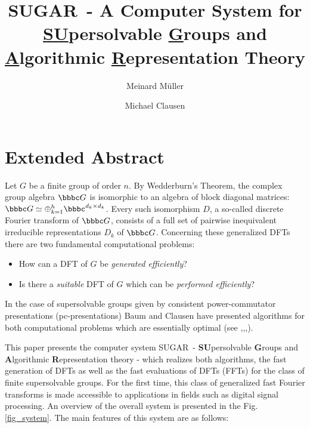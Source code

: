 \documentclass{llncs}
\def\C{{\bbbc}}
\newcommand{\NameCS}{SUGAR}
\begin{document}
\title{\NameCS\, - A Computer System for 
	\underline{SU}persolvable \underline{G}roups and 
	\underline{A}lgorithmic \underline{R}epresentation Theory} 

	
\author{Meinard M\"uller \and Michael Clausen}



\maketitle 



\section*{Extended Abstract}

Let $G$ be a finite group of order $n$. By Wedderburn's Theorem, the 
complex group algebra $\C G$ is isomorphic to an algebra of block 
diagonal matrices:
$\C G\simeq \oplus_{k=1}^h \C^{d_k\times d_k}$. 
Every such isomorphism $D$, a so-called
discrete Fourier transform of $\C G$, consists of a full set of pairwise 
inequivalent irreducible  representations $D_k$ of $\C G$. 
Concerning these generalized DFTs there are two fundamental
computational problems: 
\begin{itemize}
\item [(1)] How can a DFT of $G$ be {\em generated efficiently}?
\item [(2)] Is there a {\em suitable} DFT of $G$ which can be 
    {\em performed efficiently}?
\end{itemize}
In the case of supersolvable groups given by 
consistent power-commutator presentations (pc-presentations)
Baum and Clausen have presented algorithms for both computational
problems which are essentially optimal 
(see \cite{Ba91},\cite{BaCl94},\cite{ClBa93},\cite{ClMu99}).

This paper presents the computer system \NameCS\,
- {\bf SU}persolvable {\bf G}roups and {\bf A}lgorithmic 
{\bf R}epresentation theory -
which realizes both algorithms, the fast generation of DFTs as well as the
fast evaluations of DFTs (FFTs) for the class of 
finite supersolvable groups. For the first time, this 
class of generalized fast Fourier transforms is made 
accessible  to applications in fields such as 
digital signal processing.
An overview of the overall system is presented in
the Fig. \ref{fig_system}. The main features of this system
are as follows:
\end{document}
